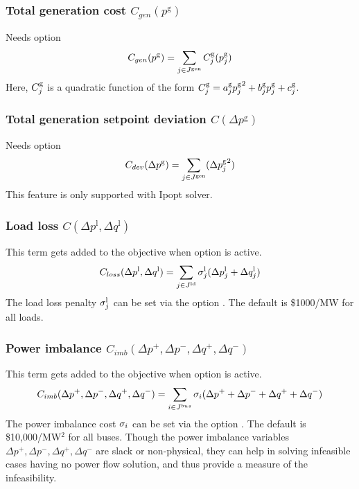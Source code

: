 \subsubsection{Total generation cost $C_{gen}(p^{\text{g}})$}
Needs option \opflowoption{\opflowobjective}{\mingencost}
\begin{equation}
C_{gen}(p^{\text{g}}) = \sum_{j \in J^\text{gen}} C^\text{g}_j(p^\text{g}_j)
\label{eq:opf_obj_mingencost}
\end{equation}
Here, $C^\text{g}_j$ is a quadratic function of the form $C^\text{g}_j = a^\text{g}_j{p^\text{g}_j}^2 + b^\text{g}_jp^\text{g}_j + c^\text{g}_j$.

\subsubsection{Total generation setpoint deviation $C(\Delta p^{\text{g}})$}
Needs option \opflowoption{\opflowobjective}{\mingensetpointdeviation}
\begin{equation}
C_{dev}(\Delta p^{\text{g}}) = \sum_{j \in J^\text{gen}} ({\Delta{p}^\text{g}_j}^2)
\label{eq:opf_obj_mingensetpointdev}
\end{equation}
This feature is only supported with Ipopt solver.

\subsubsection{Load loss $C(\Delta p^{\text{l}},\Delta q^{\text{l}})$}
This term gets added to the objective when  \option{\opflowincludeloadloss} option is active. 
\begin{equation}
C_{loss}(\Delta p^{\text{l}},\Delta q^{\text{l}}) =  \sum_{j \in J^\text{ld}} \sigma^\text{l}_j({\Delta{p}^{\text{l}}_j} + {\Delta{q}^{\text{l}}_j})
\label{eq:opf_obj_minloadloss}
\end{equation}
The load loss penalty $\sigma^\text{l}_j$ can be set via the option
. The default is \$1000/MW for all loads.

\subsubsection{Power imbalance $C_{imb}(\Delta p^{+},\Delta p^{-},\Delta q^{+},\Delta q^{-})$}
This term gets added to the objective when   option is active. 
\begin{equation}
C_{imb}(\Delta p^{+},\Delta p^{-},\Delta q^{+},\Delta q^{-}) =  \sum_{i \in J^{bus}} \sigma_i(\Delta p^{+} + \Delta p^{-} + \Delta q^{+} + \Delta q^{-})
\label{eq:opf_obj_minpowerimbalance}
\end{equation}
The power imbalance cost $\sigma_i$ can be set via the option
. The default is \$10,000/MW$^2$ for all buses. Though the power imbalance variables $\Delta p^{+},\Delta p^{-},\Delta q^{+},\Delta q^{-}$ are slack or non-physical, they can help in solving infeasible cases having no power flow solution, and thus provide a measure of the infeasibility. 

